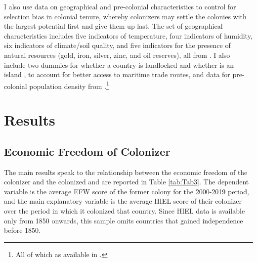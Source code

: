 \documentclass[a4paper,12pt]{article}
\begin{document}
I also use data on geographical and pre-colonial characteristics to control for selection bias in colonial tenure, whereby colonizers may settle the colonies with the largest potential first and give them up last. The set of geographical characteristics includes five indicators of temperature, four indicators of humidity, six indicators of climate/soil quality, and five indicators for the presence of natural resources (gold, iron, silver, zinc, and oil reserves), all from \cite{parker1997national}. I also include two dummies for whether a country is landlocked and whether is an island \citep{dkpublishing1997world}, to account for better access to maritime trade routes, and data for pre-colonial population density from \cite{mcevedy1978atlas}.\footnote{All of which as available in \cite{acemoglu2002reversal}.}

\section{Results}

\subsection{Economic Freedom of Colonizer}\label{sec:results_efw}

The main results speak to the relationship between the economic freedom of the colonizer and the colonized and are reported in Table \ref{tab:Tab3}. The dependent variable is the average EFW score of the former colony for the 2000-2019 period, and the main explanatory variable is the average HIEL score of their colonizer over the period in which it colonized that country. Since HIEL data is available only from 1850 onwards, this sample omits countries that gained independence before 1850.
\end{document}
